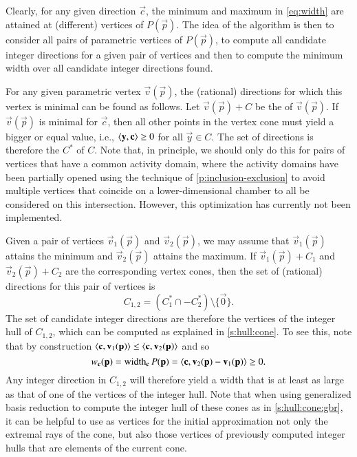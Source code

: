 Clearly, for any given direction $\vec c$, the minimum and
maximum in \eqref{eq:width} are attained at (different)
vertices of $P(\vec p)$.
The idea of the algorithm is then to consider all pairs
of parametric vertices of $P(\vec p)$, to compute all candidate
integer directions for a given pair of vertices and then to
compute the minimum width over all candidate integer directions
found.

For any given parametric vertex $\vec v(\vec p)$, the (rational)
directions for which this vertex is minimal can be found as follows.
Let $\vec v(\vec p) + C$ be the  of $\vec v(\vec p)$.
If $\vec v(\vec p)$ is minimal for $\vec c$, then all other points
in the vertex cone must yield a bigger or equal value, i.e.,
$\sp y c \ge 0$ for all $\vec y \in C$.
The set of directions is therefore the  $C^*$ of $C$.
Note that, in principle, we should only do this for pairs
of vertices that have a common activity domain, where the
activity domains have been partially opened using the
technique of \autoref{p:inclusion-exclusion} to avoid
multiple vertices that coincide on a lower-dimensional
chamber to all be considered on this intersection.
However, this optimization has currently not been implemented.

Given a pair of vertices $\vec v_1(\vec p)$ and $\vec v_2(\vec p)$,
we may assume that $\vec v_1(\vec p)$ attains the minimum and
$\vec v_2(\vec p)$ attains the maximum.
If $\vec v_1(\vec p) + C_1$ and $\vec v_2(\vec p) + C_2$ are the
corresponding vertex cones, then the set of (rational) directions for this
pair of vertices is
$$
C_{1,2} = \left( C_1^* \cap -C_2^* \right) \setminus \{ \vec 0 \}
.
$$
The set of candidate integer directions are therefore
the vertices of the integer hull of $C_{1,2}$, which
can be computed as explained in \autoref{s:hull:cone}.
To see this, note that by construction
$\sps {\vec c}{\vec v_1(\vec p)} \le \sps {\vec c}{\vec v_2(\vec p)}$
and so
$$
w_{\vec c}(\vec p) = \width_{\vec c} P(\vec p)
= \sps {\vec c}{\vec v_2(\vec p)-\vec v_1(\vec p)} \ge 0
.
$$
Any integer direction in $C_{1,2}$ will therefore yield
a width that is at least as large as that of one
of the vertices of the integer hull.
Note that when using generalized basis reduction
to compute the integer hull of these cones as in \autoref{s:hull:cone:gbr},
it can be helpful to use as vertices for the initial approximation
not only the extremal rays of the cone, but also those vertices
of previously computed integer hulls that are elements of the current cone.

